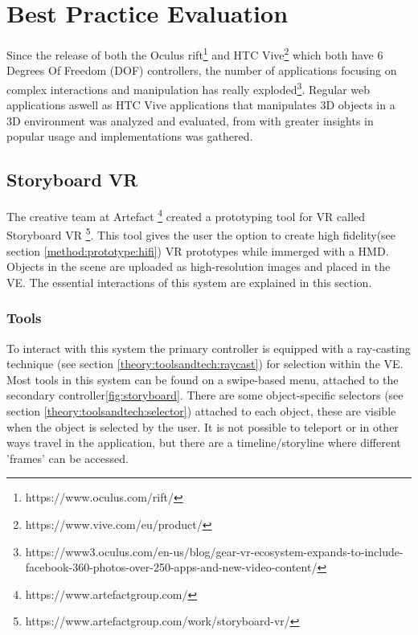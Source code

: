 \section{Best Practice Evaluation}
\label{theory:best-practice}
Since the release of both the Oculus rift\footnote{https://www.oculus.com/rift/} and HTC Vive\footnote{https://www.vive.com/eu/product/} which both have 6 Degrees Of Freedom (DOF) controllers, the number of applications focusing on complex interactions and manipulation has really exploded\footnote{https://www3.oculus.com/en-us/blog/gear-vr-ecosystem-expands-to-include-facebook-360-photos-over-250-apps-and-new-video-content/}. Regular web applications aswell as HTC Vive applications that manipulates 3D objects in a 3D environment was analyzed and evaluated, from with greater insights in popular usage and implementations was gathered.
\subsection{Storyboard VR}
The creative team at Artefact \footnote{https://www.artefactgroup.com/} created a prototyping tool for VR called Storyboard VR \footnote{https://www.artefactgroup.com/work/storyboard-vr/}. This tool gives the user the option to create high fidelity(see section \ref{method:prototype:hifi})  VR prototypes while immerged with a HMD. Objects in the scene are uploaded as high-resolution images and placed in the VE. The essential interactions of this system are explained in this section.
\subsubsection{Tools}
To interact with this system the primary controller is equipped with a ray-casting technique (see section \ref{theory:toolsandtech:raycast}) for selection within the VE.
Most tools in this system can be found on a swipe-based menu, attached to the secondary controller\ref{fig:storyboard}. There are some object-specific selectors (see section \ref{theory:toolsandtech:selector}) attached to each object, these are visible when the object is selected by the user. It is not possible to teleport or in other ways travel in the application, but there are  a timeline/storyline where different 'frames' can be accessed.

